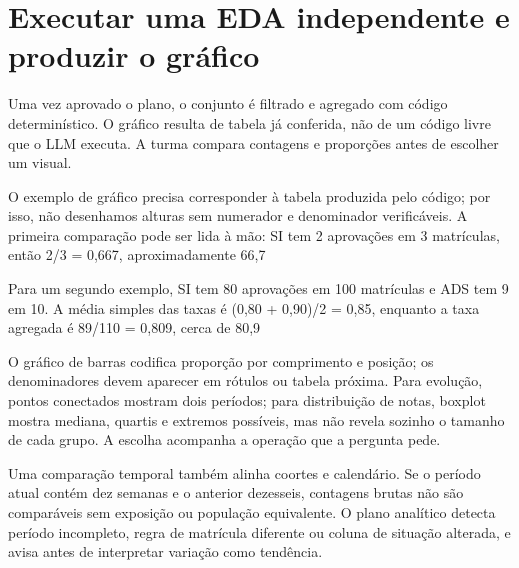 \section{Executar uma EDA independente e produzir o gráfico}

Uma vez aprovado o plano, o conjunto é filtrado e agregado com código determinístico. O gráfico resulta de tabela já conferida, não de um código livre que o LLM executa. A turma compara contagens e proporções antes de escolher um visual.

\begin{center}
\end{center}

O exemplo de gráfico precisa corresponder à tabela produzida pelo código; por isso, não desenhamos alturas sem numerador e denominador verificáveis. A primeira comparação pode ser lida à mão: SI tem 2 aprovações em 3 matrículas, então 2/3 = 0,667, aproximadamente 66,7%

Para um segundo exemplo, SI tem 80 aprovações em 100 matrículas e ADS tem 9 em 10. A média simples das taxas é (0,80 + 0,90)/2 = 0,85, enquanto a taxa agregada é 89/110 = 0,809, cerca de 80,9%

O gráfico de barras codifica proporção por comprimento e posição; os denominadores devem aparecer em rótulos ou tabela próxima. Para evolução, pontos conectados mostram dois períodos; para distribuição de notas, boxplot mostra mediana, quartis e extremos possíveis, mas não revela sozinho o tamanho de cada grupo. A escolha acompanha a operação que a pergunta pede.

Uma comparação temporal também alinha coortes e calendário. Se o período atual contém dez semanas e o anterior dezesseis, contagens brutas não são comparáveis sem exposição ou população equivalente. O plano analítico detecta período incompleto, regra de matrícula diferente ou coluna de situação alterada, e avisa antes de interpretar variação como tendência.

